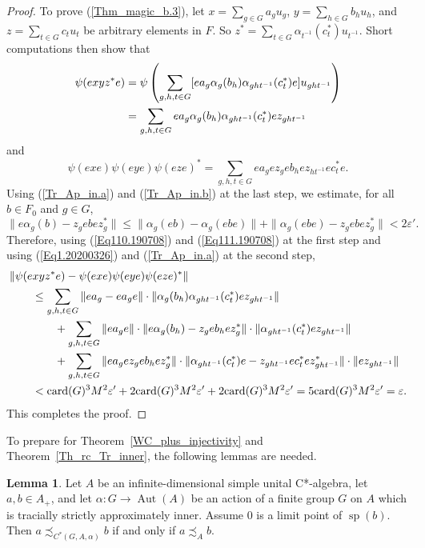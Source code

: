 \documentclass[10pt]{amsart}
\numberwithin{equation}{section}
\theoremstyle{definition}
\newtheorem{lem}[thm]{Lemma}
\newcommand{\af}{\alpha}
\newcommand{\ep}{\varepsilon}
\newcommand{\spec}{{\operatorname{sp}}}
\newcommand{\card}{{\operatorname{card}}}
\newcommand{\Aut}{{\operatorname{Aut}}}
\newcommand{\ca}{C*-algebra}
\newcommand{\CGAa}{C^* (G, A, \af)}
\begin{document}
\begin{proof}
 To prove (\ref{Thm_magic_b.3}), 
let
 $x=\sum_{g \in G} a_g u_g$, $y= \sum_{h\in G} b_h u_h$, and 
$z= \sum_{t\in G} c_t u_t$ be arbitrary elements in $F$.
So 
$z^* =\sum_{t\in G} \alpha_{t^{-1}} (c^*_t) u_{t^{-1}}$. 
Short computations then show that  
\begin{align}\label{Eq110.190708}
\psi( e xyz^* e)  
&=
\psi 
\left(
 \sum_{g,h,t  \in G} [e a_g \alpha_{g} (b_h) \alpha_{ght^{-1}} (c^*_t) e] u_{gh t^{-1}} 
 \right)
\\\notag
&=
 \sum_{g,h, t  \in G } e a_g \alpha_{g} (b_h) \alpha_{ght^{-1}} (c^*_t) e z_{gh t^{-1}}
\end{align}
and 
\begin{equation}\label{Eq111.190708}
\psi(exe) \psi(eye) \psi(eze)^*
=
  \sum_{g,h, t \in G } e a_g e z_g e b_h e z_{h t^{-1}} e c^{*}_{t} e.  
\end{equation}
Using (\ref{Tr_Ap_in.a}) and (\ref{Tr_Ap_in.b}) at the last step, 
we estimate, for all $b \in F_0$ and $g \in G$,
\begin{equation}\label{Eq1.20200326}
\| e \alpha_{g} (b) - z_g e b e z^*_g\| \leq \| \alpha_g (e b) - \alpha_g (ebe)\|
+
\| \alpha_g (ebe) - z_g e b e z^*_g \| < 2 \ep'.
\end{equation}
Therefore, using (\ref{Eq110.190708}) and (\ref{Eq111.190708}) at the first step and 
using (\ref{Eq1.20200326}) and (\ref{Tr_Ap_in.a}) at the second step,
\begin{align*}
&\| \psi (e xy z^* e) - \psi (e x e) \psi(e y e) \psi(e z e)^*\| 
\\
& \hspace*{2em} {\mbox{}} \leq
\sum_{g,h, t  \in G} 
\|e a_g -  e a_g e \| \cdot \| \alpha_{g} (b_h) \alpha_{ght^{-1}} (c^*_t) e z_{gh t^{-1}} \|
\\
&\hspace*{4em} {\mbox{}}+ 
\sum_{g,h, t  \in G} 
\|e a_g e \| \cdot \| e \alpha_{g} (b_h) - z_g e b_h e z^*_g \| \cdot \| \alpha_{ght^{-1}} (c^*_t) e z_{gh t^{-1}} \| 
\\
&  \hspace*{4em} {\mbox{}} + 
\sum_{g,h, t  \in G} 
\|e a_g e z_g e b_h e z^*_g \| 
\cdot 
\|  \alpha_{ght^{-1}} (c^*_t) e - z_{ght^{-1}} e c^*_t e z^*_{ght^{-1}} \|
 \cdot 
 \| e z_{gh t^{-1}} \|
\\
&  \hspace*{2em} {\mbox{}} <
 \card(G)^3 M^2 \ep' + 2\card(G)^3 M^2 \ep'+ 2\card(G)^3 M^2 \ep' = 5 \card(G)^3 M^2 \ep' =\ep.
\end{align*}
This completes the proof. 
\end{proof}
%
To prepare for Theorem~\ref{WC_plus_injectivity} and Theorem~\ref{Th_rc_Tr_inner}, the following lemmas are needed.
%
\begin{lem}\label{L_CR_Limit}
Let $A$ be an infinite-dimensional simple unital
 \ca{}, let $a, b \in A_+$, and 
 let  $\alpha \colon  G \to \Aut(A)$ be an action of a 
finite  group $G$ on $A$ which is tracially strictly   approximately inner. 
Assume $0$ is a limit point of $\spec (b)$.
Then  $a \precsim_{\CGAa} b$ if and only if 
  $a \precsim_{A} b$.
\end{lem}
\end{document}
